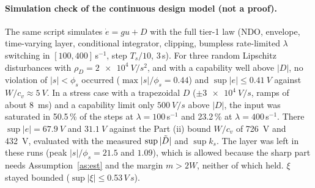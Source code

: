 \paragraph{Simulation check of the continuous design model (not a proof).} The same script simulates $\dot e=gu+D$ with the full tier-1 law (NDO, envelope, time-varying layer, conditional integrator, clipping, bumpless rate-limited $\lambda$ switching in $[100,400]$\,s$^{-1}$, step $T_s/10$, 3\,s). For three random Lipschitz disturbances with $\rho_D=\SI{2e4}{V/s^2}$, and with a capability well above $|D|$, no violation of $|s|<\phi_s$ occurred ($\max|s|/\phi_s=0.44$) and $\sup|e|\le\SI{0.41}{V}$ against $W/c_v\approx\SI{5}{V}$. In a stress case with a trapezoidal $D$ ($\pm\SI{3e4}{V/s}$, ramps of about \SI{8}{ms}) and a capability limit only $\SI{500}{V/s}$ above $|D|$, the input was saturated in 50.5\,\% of the steps at $\lambda=100$\,s$^{-1}$ and 23.2\,\% at $\lambda=400$\,s$^{-1}$. There $\sup|e|=\SI{67.9}{V}$ and $\SI{31.1}{V}$ against the Part (ii) bound $W/c_v$ of \SI{726}{V} and \SI{432}{V}, evaluated with the measured $\sup|\tilde{D}|$ and $\sup k_s$. The layer was left in these runs (peak $|s|/\phi_s=21.5$ and $1.09$), which is allowed because the sharp part needs Assumption~\ref{as:est} and the margin $m>2W$, neither of which held. $\xi$ stayed bounded ($\sup|\xi|\le$0.53$\,V\,s$).
